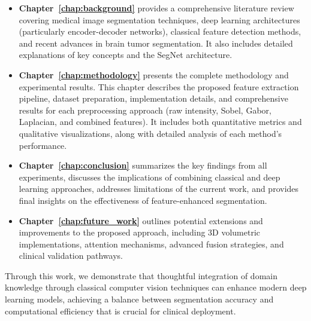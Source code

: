\begin{itemize}
    \item \textbf{Chapter~\ref{chap:background}} provides a comprehensive literature review covering medical image segmentation techniques, deep learning architectures (particularly encoder-decoder networks), classical feature detection methods, and recent advances in brain tumor segmentation. It also includes detailed explanations of key concepts and the SegNet architecture.
    
    \item \textbf{Chapter~\ref{chap:methodology}} presents the complete methodology and experimental results. This chapter describes the proposed feature extraction pipeline, dataset preparation, implementation details, and comprehensive results for each preprocessing approach (raw intensity, Sobel, Gabor, Laplacian, and combined features). It includes both quantitative metrics and qualitative visualizations, along with detailed analysis of each method's performance.
    
    \item \textbf{Chapter~\ref{chap:conclusion}} summarizes the key findings from all experiments, discusses the implications of combining classical and deep learning approaches, addresses limitations of the current work, and provides final insights on the effectiveness of feature-enhanced segmentation.
    
    \item \textbf{Chapter~\ref{chap:future_work}} outlines potential extensions and improvements to the proposed approach, including 3D volumetric implementations, attention mechanisms, advanced fusion strategies, and clinical validation pathways.
\end{itemize}

Through this work, we demonstrate that thoughtful integration of domain knowledge through classical computer vision techniques can enhance modern deep learning models, achieving a balance between segmentation accuracy and computational efficiency that is crucial for clinical deployment.